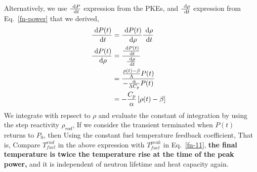 \documentclass{school-22.211-notes}
\begin{document}
Alternatively, we use $\frac{\mbox{ }\mathrm{d} P}{\mbox{ }\mathrm{d} t}$ expression from the PKEs, and $\frac{\mbox{ }\mathrm{d} \rho}{\mbox{ }\mathrm{d} t}$ expression from Eq.~\ref{fn-power} that we derived, 
\begin{align}
\frac{\mbox{ }\mathrm{d} P(t)}{\mbox{ }\mathrm{d} t} &= \frac{\mbox{ }\mathrm{d} P(t)}{\mbox{ }\mathrm{d} \rho} \frac{\mbox{ }\mathrm{d} \rho}{\mbox{ }\mathrm{d} t}  \\
\frac{\mbox{ }\mathrm{d} P(t)}{\mbox{ }\mathrm{d} \rho} &= \frac{  \frac{\mbox{ }\mathrm{d} P(t)}{\mbox{ }\mathrm{d} t} }{  \frac{\mbox{ }\mathrm{d} \rho}{\mbox{ }\mathrm{d} t} } \\
&= \frac{ \frac{\rho(t) - \beta}{\Lambda} P(t) }{ - \frac{\alpha}{\Lambda C_p } P(t)} \\
&= - \frac{C_p}{\alpha} \left[ \rho(t) - \beta \right] 
\end{align}
We integrate with repsect to $\rho$ and evaluate the constant of integration by using the step reactivity $\rho_{rod}$, 
If we consider the transient terminated when $P(t)$ returns to $P_0$, then 
Using the constant fuel temperature feedback coefficient, 
That is, 
  Compare $T_{fuel}^{end}$ in the above expression with $T_{fuel}^{peak}$ in Eq.~\ref{fn-11}, \textbf{the final temperature is twice the temperature rise at the time of the peak power,} and it is independent of neutron lifetime and heat capacity again. 
\end{document}
